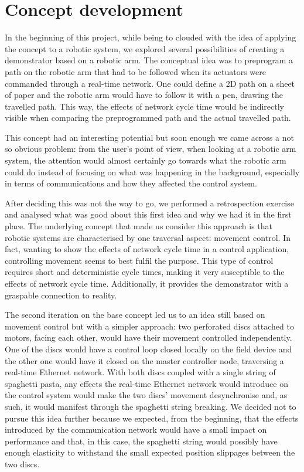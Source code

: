 \section{Concept development}

In the beginning of this project, while being to clouded with the idea of applying the concept to a robotic system, we explored several possibilities of creating a demonstrator based on a robotic arm.
The conceptual idea was to preprogram a path on the robotic arm that had to be followed when its actuators were commanded through a real-time network.
One could define a 2D path on a sheet of paper and the robotic arm would have to follow it with a pen, drawing the travelled path.
This way, the effects of network cycle time would be indirectly visible when comparing the preprogrammed path and the actual travelled path.

This concept had an interesting potential but soon enough we came across a not so obvious problem: from the user's point of view, when looking at a robotic arm system, the attention would almost certainly go towards what the robotic arm could do instead of focusing on what was happening in the background, especially in terms of communications and how they affected the control system.

After deciding this was not the way to go, we performed a retrospection exercise and analysed what was good about this first idea and why we had it in the first place.
The underlying concept that made us consider this approach is that robotic systems are characterised by one traversal aspect: movement control.
In fact, wanting to show the effects of network cycle time in a control application, controlling movement seems to best fulfil the purpose.
This type of control requires short and deterministic cycle times, making it very susceptible to the effects of network cycle time.
Additionally, it provides the demonstrator with a graspable connection to reality.

The second iteration on the base concept led us to an idea still based on movement control but with a simpler approach: two perforated discs attached to motors, facing each other, would have their movement controlled independently.
One of the discs would have a control loop closed locally on the field device and the other one would have it closed on the master controller node, traversing a real-time Ethernet network.
With both discs coupled with a single string of spaghetti pasta, any effects the real-time Ethernet network would introduce on the control system would make the two discs' movement desynchronise and, as such, it would manifest through the spaghetti string breaking.
We decided not to pursue this idea further because we expected, from the beginning, that the effects introduced by the communication network would have a small impact on performance and that, in this case, the spaghetti string would possibly have enough elasticity to withstand the small expected position slippages between the two discs.

